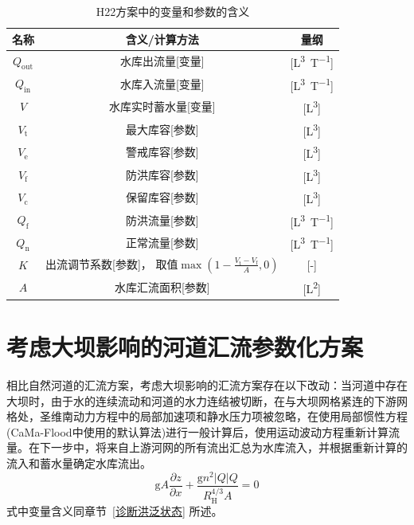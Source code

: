 \begin{table}[htbp]
    \centering
    \caption{H22方案中的变量和参数的含义}
    \label{tab:H22方案变量参数表}
    \begin{tabular}{ccc}
    \toprule
    名称 & 含义/计算方法 & 量纲 \\ \midrule
    $Q_{\mathrm{out}}$  & 水库出流量[变量]  & [\unit{L^3.T^{-1}}]  \\
    $Q_{\mathrm{in}}$ & 水库入流量[变量] & [\unit{L^3.T^{-1}}] \\
    $V$ & 水库实时蓄水量[变量] & [\unit{L^3}] \\
    $V_{\mathrm{t}}$  &  最大库容[参数] & [\unit{L^3}] \\
    $V_{\mathrm{e}}$ & 警戒库容[参数]  &[\unit{L^3}] \\
    $V_{\mathrm{f}}$  & 防洪库容[参数] & [\unit{L^3}]  \\
    $V_{\mathrm{c}}$  & 保留库容[参数] & [\unit{L^3}]  \\
    $Q_{\mathrm{f}}$ & 防洪流量[参数] & [\unit{L^3.T^{-1}}]  \\
    $Q_{\mathrm{n}}$ & 正常流量[参数] & [\unit{L^3.T^{-1}}]  \\
    $K$ & \makecell{出流调节系数[参数]，\\取值$\max\left(1-\frac{V_{\mathrm{t}}-V_{\mathrm{f}}}{A},0\right)$} & [-] \\
    $A$ & 水库汇流面积[参数] & [\unit{L^2}] \\
    \bottomrule
    \end{tabular}
\end{table}

\section{考虑大坝影响的河道汇流参数化方案}
相比自然河道的汇流方案，考虑大坝影响的汇流方案存在以下改动：当河道中存在大坝时，由于水的连续流动和河道的水力连结被切断，在与大坝网格紧连的下游网格处，圣维南动力方程中的局部加速项和静水压力项被忽略，在使用局部惯性方程(CaMa-Flood中使用的默认算法)进行一般计算后，使用运动波动方程重新计算流量。在下一步中，将来自上游河网的所有流出汇总为水库流入，并根据重新计算的流入和蓄水量确定水库流出。
\begin{equation}
  {\mathrm g} A \frac{\partial z}{\partial x}+\frac{{\mathrm g} n^{2}|Q| Q}{R_{\mathrm{H}}^{4 / 3} A}=0
\end{equation}
式中变量含义同章节~\ref{诊断洪泛状态} 所述。


